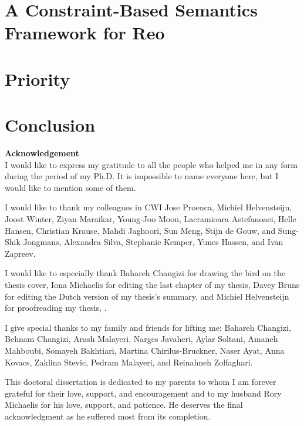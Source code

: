 \documentclass[runnngheads]{book}
\begin{document}
\chapter{A Constraint-Based Semantics Framework for Reo}
\label{chapterCASM}

\chapter{Priority}
\label{ch:prio}

\chapter{Conclusion}
\label{ch:concl}
\singlespacing

\clearpage


\newpage


\newpage
{\textbf{\Large{Acknowledgement}}}
\vspace*{1cm}
\\
I would like to express my gratitude to all the people who helped me in any form during the period of my Ph.D. It is impossible to name everyone here, but I would like to mention some of them.

I would like to thank my colleagues in CWI Jose Proenca, Michiel Helvensteijn, Joost Winter, Ziyan Maraikar, Young-Joo Moon, Lacramioara Astefanoaei, Helle Hansen, Christian Krause, Mahdi Jaghoori, Sun Meng, Stijn de Gouw, and Sung-Shik Jongmans, Alexandra Silva, Stephanie Kemper, Yunes Hassen, and Ivan Zapreev.

I would like to especially thank Bahareh Changizi for drawing the bird on the thesis cover, Iona Michaelis for editing the last chapter of my thesis, Davey Bruns for editing the Dutch version of my thesis's summary, and Michiel Helvensteijn for proofreading my thesis, .

I give special thanks to my family and friends for lifting me: Bahareh Changizi,  Behnam Changizi, Arash Malayeri, Narges Javaheri, Aylar Soltani, Amaneh Mahboubi, Somayeh Bakhtiari, Martina Chirilus-Bruckner, Naser Ayat, Anna Kovacs, Zaklina Stevic, Pedram Malayeri, and Reinahneh Zolfaghari.

This doctoral dissertation is dedicated to my parents to whom I am forever grateful for their love, support, and encouragement and to my husband Rory Michaelis for his love, support, and patience. He
deserves the final acknowledgment as he suffered most from its completion.
\end{document}
